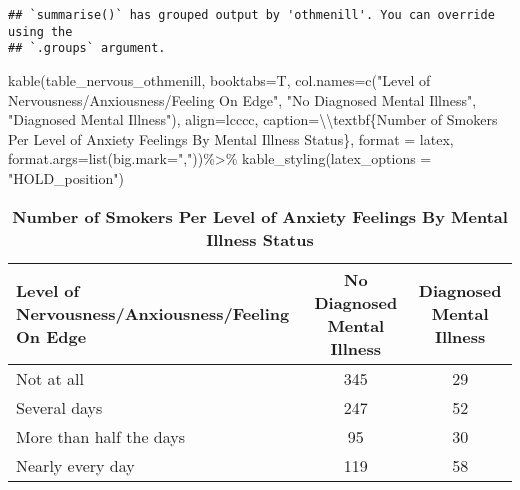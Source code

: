 \documentclass[
]{article}
\newenvironment{Shaded}{\begin{snugshade}}{\end{snugshade}}
\newcommand{\AttributeTok}[1]{\textcolor[rgb]{0.77,0.63,0.00}{#1}}
\newcommand{\FunctionTok}[1]{\textcolor[rgb]{0.00,0.00,0.00}{#1}}
\newcommand{\NormalTok}[1]{#1}
\newcommand{\SpecialCharTok}[1]{\textcolor[rgb]{0.00,0.00,0.00}{#1}}
\newcommand{\StringTok}[1]{\textcolor[rgb]{0.31,0.60,0.02}{#1}}
\begin{document}
\begin{verbatim}
## `summarise()` has grouped output by 'othmenill'. You can override using the
## `.groups` argument.
\end{verbatim}

\begin{Shaded}
\begin{Highlighting}[]
\FunctionTok{kable}\NormalTok{(table\_nervous\_othmenill, }
      \AttributeTok{booktabs=}\NormalTok{T, }
      \AttributeTok{col.names=}\FunctionTok{c}\NormalTok{(}\StringTok{"Level of Nervousness/Anxiousness/Feeling On Edge"}\NormalTok{,}
                  \StringTok{"No Diagnosed Mental Illness"}\NormalTok{, }\StringTok{"Diagnosed Mental Illness"}\NormalTok{),  }
      \AttributeTok{align=}\StringTok{\textquotesingle{}lcccc\textquotesingle{}}\NormalTok{, }
      \AttributeTok{caption=}\StringTok{\textquotesingle{}}\SpecialCharTok{\textbackslash{}\textbackslash{}}\StringTok{textbf\{Number of Smokers Per Level of }
\StringTok{      Anxiety Feelings By Mental Illness Status\}\textquotesingle{}}\NormalTok{,}
      \AttributeTok{format =} \StringTok{\textquotesingle{}latex\textquotesingle{}}\NormalTok{,}
      \AttributeTok{format.args=}\FunctionTok{list}\NormalTok{(}\AttributeTok{big.mark=}\StringTok{","}\NormalTok{))}\SpecialCharTok{\%\textgreater{}\%}
  \FunctionTok{kable\_styling}\NormalTok{(}\AttributeTok{latex\_options =} \StringTok{"HOLD\_position"}\NormalTok{)}
\end{Highlighting}
\end{Shaded}

\begin{table}[H]

\caption{\label{tab:importing data for reference}\textbf{Number of Smokers Per Level of 
      Anxiety Feelings By Mental Illness Status}}
\centering
\begin{tabular}[t]{lcc}
\toprule
Level of Nervousness/Anxiousness/Feeling On Edge & No Diagnosed Mental Illness & Diagnosed Mental Illness\\
\midrule
Not at all & 345 & 29\\
Several days & 247 & 52\\
More than half the days & 95 & 30\\
Nearly every day & 119 & 58\\
\bottomrule
\end{tabular}
\end{table}
\end{document}
